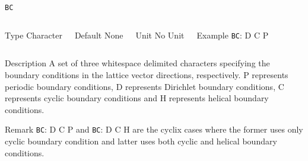 \begin{frame}[allowframebreaks]{\texttt{{BC}}} \label{BC}
\vspace*{-12pt}
\begin{columns}
\begin{block}{Type}
Character
\end{block}

\begin{block}{Default}
None
\end{block}

\begin{block}{Unit}
No Unit
\end{block}

\begin{block}{Example}
\texttt{BC}: D C P
\end{block}
\end{columns}

\begin{block}{Description}
A set of three whitespace delimited characters specifying the boundary conditions in the lattice vector directions, respectively. P represents periodic boundary conditions, D represents Dirichlet boundary conditions, C represents cyclic boundary conditions and H represents helical boundary conditions.
\end{block}

\begin{block}{Remark}
\texttt{BC}: D C P and \texttt{BC}: D C H are the cyclix cases where the former uses only cyclic boundary condition and latter uses both cyclic and helical boundary conditions.
\end{block}
\end{frame}

